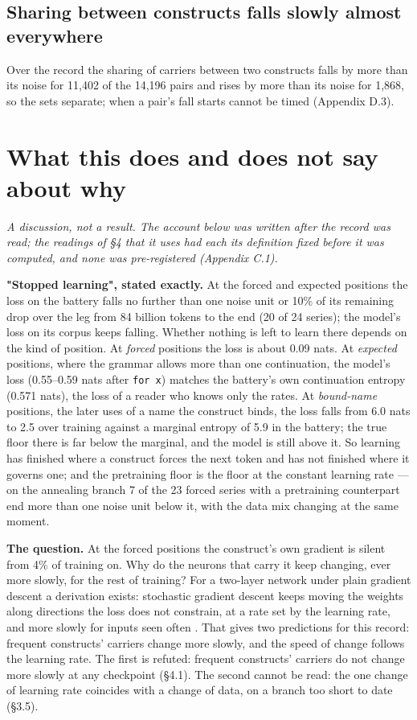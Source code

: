 \documentclass{article}
\begin{document}
\subsection{Sharing between constructs falls slowly almost everywhere}

Over the record the sharing of carriers between two constructs falls by more than its noise for 11,402 of the 14,196 pairs and rises by more than its noise for 1,868, so the sets separate; when a pair's fall starts cannot be timed (Appendix D.3).

\section{What this does and does not say about why}

\emph{A discussion, not a result. The account below was written after the record was read; the readings of \S4 that it uses had each its definition fixed before it was computed, and none was pre-registered (Appendix C.1).}

\textbf{"Stopped learning", stated exactly.} At the forced and expected positions the loss on the battery falls no further than one noise unit or 10\% of its remaining drop over the leg from 84 billion tokens to the end (20 of 24 series); the model's loss on its corpus keeps falling. Whether nothing is left to learn there depends on the kind of position. At \emph{forced} positions the loss is about 0.09 nats. At \emph{expected} positions, where the grammar allows more than one continuation, the model's loss (0.55--0.59 nats after \texttt{for x}) matches the battery's own continuation entropy (0.571 nats), the loss of a reader who knows only the rates. At \emph{bound-name} positions, the later uses of a name the construct binds, the loss falls from 6.0 nats to 2.5 over training against a marginal entropy of 5.9 in the battery; the true floor there is far below the marginal, and the model is still above it. So learning has finished where a construct forces the next token and has not finished where it governs one; and the pretraining floor is the floor at the constant learning rate --- on the annealing branch 7 of the 23 forced series with a pretraining counterpart end more than one noise unit below it, with the data mix changing at the same moment.

\textbf{The question.} At the forced positions the construct's own gradient is silent from 4\% of training on. Why do the neurons that carry it keep changing, ever more slowly, for the rest of training? For a two-layer network under plain gradient descent a derivation exists: stochastic gradient descent keeps moving the weights along directions the loss does not constrain, at a rate set by the learning rate, and more slowly for inputs seen often \citep{pashakhanloo2023}. That gives two predictions for this record: frequent constructs' carriers change more slowly, and the speed of change follows the learning rate. The first is refuted: frequent constructs' carriers do not change more slowly at any checkpoint (\S4.1). The second cannot be read: the one change of learning rate coincides with a change of data, on a branch too short to date (\S3.5).
\end{document}
